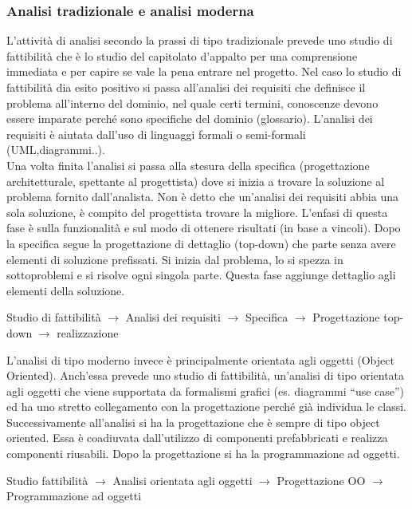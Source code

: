 \subsubsection{Analisi tradizionale e analisi moderna}
L'attività di analisi secondo la prassi di tipo tradizionale prevede uno studio di fattibilità che è lo studio del capitolato d'appalto per una comprensione immediata e per capire se vale la pena entrare nel progetto. Nel caso lo studio di fattibilità dia esito positivo si passa all'analisi dei requisiti che definisce il problema all'interno del dominio, nel quale certi termini, conoscenze devono essere imparate perché sono specifiche del dominio (glossario). 
L'analisi dei requisiti è aiutata dall'uso di linguaggi formali o semi-formali (UML,diagrammi..).\\
Una volta finita l'analisi si passa alla stesura della specifica (progettazione architetturale, spettante al progettista) dove si inizia a trovare la soluzione al problema fornito dall'analista. 
Non è detto che un'analisi dei requisiti abbia una sola soluzione, è compito del progettista trovare la migliore. 
L'enfasi di questa fase è sulla funzionalità e sul modo di ottenere risultati (in base a vincoli).
Dopo la specifica segue la progettazione di dettaglio (top-down) che parte senza avere elementi di soluzione prefissati. Si inizia dal problema, lo si spezza in sottoproblemi e si risolve ogni singola parte. 
Questa fase aggiunge dettaglio agli elementi della soluzione.
\begin{center}
Studio di fattibilità $\rightarrow$ Analisi dei requisiti $\rightarrow$ Specifica $\rightarrow$ Progettazione top-down $\rightarrow$ realizzazione
\end{center}
L'analisi di tipo moderno invece è principalmente orientata agli oggetti (Object Oriented). 
Anch'essa prevede uno studio di fattibilità, un'analisi di tipo orientata agli oggetti che viene supportata da formalismi grafici (es. diagrammi ``use case'') ed ha uno stretto collegamento con la progettazione perché già individua le classi. 
Successivamente all'analisi si ha la progettazione che è sempre di tipo object oriented. 
Essa è coadiuvata dall'utilizzo di componenti prefabbricati e realizza componenti riusabili. 
Dopo la progettazione si ha la programmazione ad oggetti.
\begin{center}
Studio fattibilità $\rightarrow$ Analisi orientata agli oggetti $\rightarrow$ Progettazione OO $\rightarrow$ Programmazione ad oggetti
\end{center}

